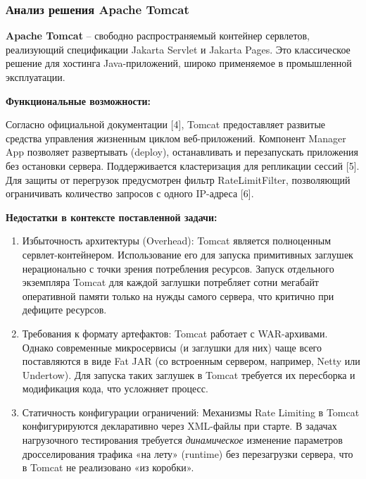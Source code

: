 \documentclass[
]{article}
\begin{document}
\subsubsection{Анализ решения Apache
Tomcat}\label{ux430ux43dux430ux43bux438ux437-ux440ux435ux448ux435ux43dux438ux44f-apache-tomcat}

\textbf{Apache Tomcat} -- свободно распространяемый контейнер сервлетов,
реализующий спецификации Jakarta Servlet и Jakarta Pages. Это
классическое решение для хостинга Java-приложений, широко применяемое в
промышленной эксплуатации.

\textbf{Функциональные возможности:}

Согласно официальной документации {[}4{]}, Tomcat предоставляет развитые
средства управления жизненным циклом веб-приложений. Компонент Manager
App позволяет развертывать (deploy), останавливать и перезапускать
приложения без остановки сервера. Поддерживается кластеризация для
репликации сессий {[}5{]}. Для защиты от перегрузок предусмотрен фильтр
RateLimitFilter, позволяющий ограничивать количество запросов с одного
IP-адреса {[}6{]}.

\textbf{Недостатки в контексте поставленной задачи:}

\begin{enumerate}
\def\labelenumi{\arabic{enumi}.}
\item
  Избыточность архитектуры (Overhead): Tomcat является полноценным
  сервлет-контейнером. Использование его для запуска примитивных
  заглушек нерационально с точки зрения потребления ресурсов. Запуск
  отдельного экземпляра Tomcat для каждой заглушки потребляет сотни
  мегабайт оперативной памяти только на нужды самого сервера, что
  критично при дефиците ресурсов.
\item
  Требования к формату артефактов: Tomcat работает с WAR-архивами.
  Однако современные микросервисы (и заглушки для них) чаще всего
  поставляются в виде Fat JAR (со встроенным сервером, например, Netty
  или Undertow). Для запуска таких заглушек в Tomcat требуется их
  пересборка и модификация кода, что усложняет процесс.
\item
  Статичность конфигурации ограничений: Механизмы Rate Limiting в Tomcat
  конфигурируются декларативно через XML-файлы при старте. В задачах
  нагрузочного тестирования требуется \emph{динамическое} изменение
  параметров дросселирования трафика «на лету» (runtime) без
  перезагрузки сервера, что в Tomcat не реализовано «из коробки».
\end{enumerate}
\end{document}
